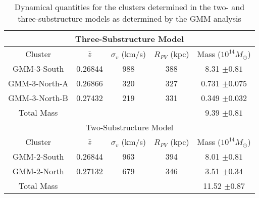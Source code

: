\documentclass[onecolumn]{aastex}
\begin{document}
\begin{table}
\centering
\begin{threeparttable}
\caption{Dynamical quantities for the clusters determined in the two- and three-substructure models as determined by the GMM analysis}
\label{tab:DynMass}
\begin{tabular}{ccccc}
\hline
\hline
\multicolumn{5}{c}{Three-Substructure Model}                                          \\ \hline
Cluster & $\bar{z}$ & $\sigma_v$ (km/s) & $R_{PV}$ (kpc) & Mass ($10^{14} M_\odot$) \\ \hline
GMM-3-South    & 0.26844  & 988   & 388     & 8.31 $\pm 0.81$ \\
GMM-3-North-A  & 0.26866  & 320   & 327     & 0.731 $\pm 0.075$ \\
GMM-3-North-B  & 0.27432  & 219   & 331     & 0.349 $\pm 0.032$ \\
Total Mass &        &       &         & 9.39 $\pm 0.81$       \\ 
\hline
\hline
\multicolumn{5}{c}{Two-Substructure Model}                                          \\ \hline
Cluster & $\bar{z}$ & $\sigma_v$ (km/s) & $R_{PV}$ (kpc) & Mass ($10^{14} M_\odot$) \\ \hline
GMM-2-South   & 0.26844  & 963    & 394     & 8.01 $\pm 0.81$  \\
GMM-2-North   & 0.27132  & 679    & 346     & 3.51 $\pm 0.34$  \\
Total Mass &	   &		&		  & 11.52 $\pm 0.87$       \\
\hline
\end{tabular}
\end{threeparttable}
\end{table}
\end{document}

